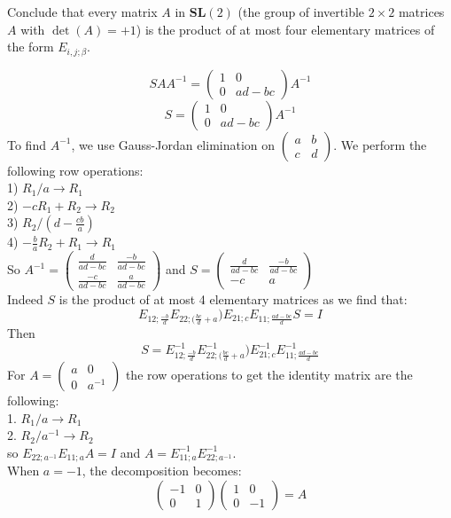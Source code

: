 \documentclass[12pt]{article}
\begin{document}
\medskip
Conclude that every matrix $A$ in $\mathbf{SL}(2)$ 
(the group of invertible $2\times 2$ matrices $A$ with
$\det(A) = +1$)  is the product of
at most four elementary matrices
of the form $E_{i, j; \beta}$.

$$ S A A^{-1} = \begin{pmatrix}
1 & 0 \\ 0 & ad - bc
\end{pmatrix}A^{-1}$$
$$ S = \begin{pmatrix}
1 & 0 \\ 0 & ad - bc
\end{pmatrix}A^{-1}$$
To find $A^{-1}$, we use Gauss-Jordan elimination on $\begin{pmatrix}
a & b \\ c & d
\end{pmatrix}$.
We perform the following row operations:\\
1) $R_1/a \rightarrow R_1$\\
2) $-cR_1 + R_2 \rightarrow R_2$\\
3) $R_2/(d - \frac{cb}{a}) $\\
4) $-\frac{b}{a}R_2 + R_1 \rightarrow R_1$\\ 
So $A^{-1} = \begin{pmatrix}
\frac{d}{ad - bc} & \frac{-b}{ad - bc}\\
\frac{-c}{ad - bc} & \frac{a}{ad - bc}
\end{pmatrix}$ and $S = \begin{pmatrix}
\frac{d}{ad - bc} & \frac{-b}{ad - bc}\\
-c & a
\end{pmatrix}$
\\ 
Indeed $S$ is the product of at most 4 elementary matrices as we find that:
$$E_{12;\frac{-b}{d}}E_{22;(\frac{bc}{d} +a})E_{21;c}E_{11;\frac{ad - bc}{d}}S = I$$
Then $$ S = E^{-1}_{12;\frac{-b}{d}}E^{-1}_{22;(\frac{bc}{d} +a})E^{-1}_{21;c}E^{-1}_{11;\frac{ad - bc}{d}}$$
For $A = \begin{pmatrix}
a & 0 \\ 0 & a^{-1}
\end{pmatrix}$ the row operations to get the identity matrix are the following:\\
1. $R_1/a \rightarrow R_1$\\
2. $R_2/a^{-1} \rightarrow R_2 $\\

so $E_{22; a^{-1}} E_{11; a} A = I $ and 
$A = E^{-1}_{11; a}E^{-1}_{22; a^{-1}}$.\\
When $a = -1$, the decomposition becomes:
$$\begin{pmatrix}
-1 & 0 \\ 0 & 1
\end{pmatrix}\begin{pmatrix}
1 & 0 \\ 0 & -1
\end{pmatrix} = A$$
\end{document}

